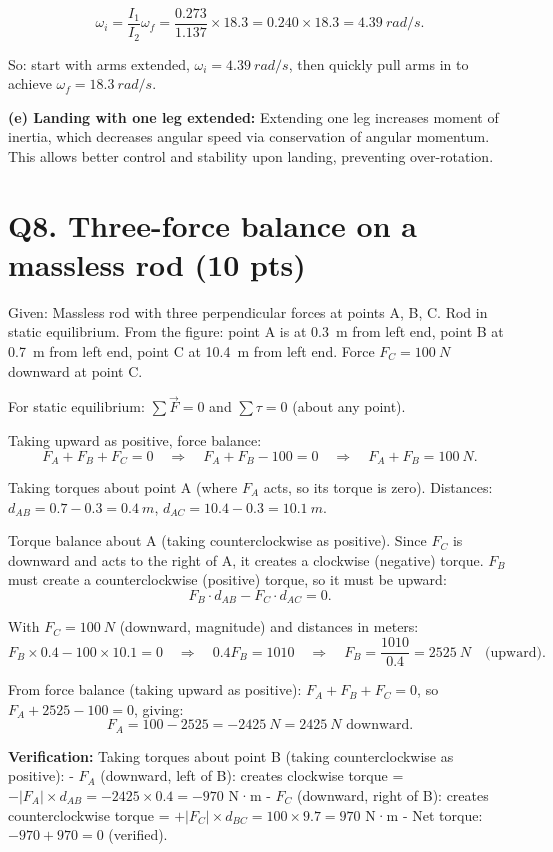 \documentclass[11pt]{article}
\newcommand{\ans}[1]{\boxed{\displaystyle #1}}
\begin{document}
\[ \omega_i = \frac{I_1}{I_2} \omega_f = \frac{0.273}{1.137} \times 18.3 = 0.240 \times 18.3 = \ans{\SI{4.39}{rad/s}}. \]

So: start with arms extended, $\omega_i = \SI{4.39}{rad/s}$, then quickly pull arms in to achieve $\omega_f = \SI{18.3}{rad/s}$.

\textbf{(e) Landing with one leg extended:} Extending one leg increases moment of inertia, which decreases angular speed via conservation of angular momentum. This allows better control and stability upon landing, preventing over-rotation.

\section*{Q8. Three-force balance on a massless rod (10 pts)}
Given: Massless rod with three perpendicular forces at points A, B, C. Rod in static equilibrium. From the figure: point A is at \SI{0.3}{m} from left end, point B at \SI{0.7}{m} from left end, point C at \SI{10.4}{m} from left end. Force $F_C = \SI{100}{N}$ downward at point C.

For static equilibrium: $\sum \vec{F} = 0$ and $\sum \tau = 0$ (about any point).

Taking upward as positive, force balance:
\[ F_A + F_B + F_C = 0 \quad\Rightarrow\quad F_A + F_B - 100 = 0 \quad\Rightarrow\quad F_A + F_B = \SI{100}{N}. \]

Taking torques about point A (where $F_A$ acts, so its torque is zero). Distances: $d_{AB} = 0.7 - 0.3 = \SI{0.4}{m}$, $d_{AC} = 10.4 - 0.3 = \SI{10.1}{m}$.

Torque balance about A (taking counterclockwise as positive). Since $F_C$ is downward and acts to the right of A, it creates a clockwise (negative) torque. $F_B$ must create a counterclockwise (positive) torque, so it must be upward:
\[ F_B \cdot d_{AB} - F_C \cdot d_{AC} = 0. \]

With $F_C = \SI{100}{N}$ (downward, magnitude) and distances in meters:
\[ F_B \times 0.4 - 100 \times 10.1 = 0 \quad\Rightarrow\quad 0.4F_B = 1010 \quad\Rightarrow\quad F_B = \frac{1010}{0.4} = \ans{\SI{2525}{N}} \quad \text{(upward)}. \]

From force balance (taking upward as positive): $F_A + F_B + F_C = 0$, so $F_A + 2525 - 100 = 0$, giving:
\[ F_A = 100 - 2525 = \ans{\SI{-2425}{N}} = \SI{2425}{N} \text{ downward}. \]

\textbf{Verification:} Taking torques about point B (taking counterclockwise as positive):
- $F_A$ (downward, left of B): creates clockwise torque = $-|F_A| \times d_{AB} = -2425 \times 0.4 = -970$ N·m
- $F_C$ (downward, right of B): creates counterclockwise torque = $+|F_C| \times d_{BC} = 100 \times 9.7 = 970$ N·m
- Net torque: $-970 + 970 = 0$ (verified).
\end{document}
